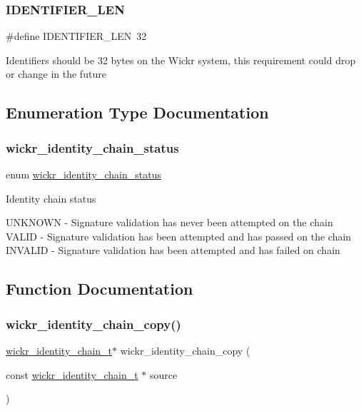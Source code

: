\subsubsection{\texorpdfstring{I\+D\+E\+N\+T\+I\+F\+I\+E\+R\+\_\+\+L\+EN}{IDENTIFIER\_LEN}}
{\footnotesize\ttfamily \#define I\+D\+E\+N\+T\+I\+F\+I\+E\+R\+\_\+\+L\+EN~32}

Identifiers should be 32 bytes on the Wickr system, this requirement could drop or change in the future 

\subsection{Enumeration Type Documentation}
\mbox{\label{group__wickr__identity_ga78aefa3835eb13ca75c0129583b5ebfa}} 
\subsubsection{\texorpdfstring{wickr\+\_\+identity\+\_\+chain\+\_\+status}{wickr\_identity\_chain\_status}}
{\footnotesize\ttfamily enum \mbox{\hyperlink{group__wickr__identity_ga78aefa3835eb13ca75c0129583b5ebfa}{wickr\+\_\+identity\+\_\+chain\+\_\+status}}}

Identity chain status

U\+N\+K\+N\+O\+WN -\/ Signature validation has never been attempted on the chain V\+A\+L\+ID -\/ Signature validation has been attempted and has passed on the chain I\+N\+V\+A\+L\+ID -\/ Signature validation has been attempted and has failed on chain 

\subsection{Function Documentation}
\mbox{\label{group__wickr__identity_gac9d708d340abcd0b54d87434b71d2d9e}} 
\subsubsection{\texorpdfstring{wickr\+\_\+identity\+\_\+chain\+\_\+copy()}{wickr\_identity\_chain\_copy()}}
{\footnotesize\ttfamily \mbox{\hyperlink{structwickr__identity__chain}{wickr\+\_\+identity\+\_\+chain\+\_\+t}}$\ast$ wickr\+\_\+identity\+\_\+chain\+\_\+copy (\begin{DoxyParamCaption}\item[{const \mbox{\hyperlink{structwickr__identity__chain}{wickr\+\_\+identity\+\_\+chain\+\_\+t}} $\ast$}]{source }\end{DoxyParamCaption})}

